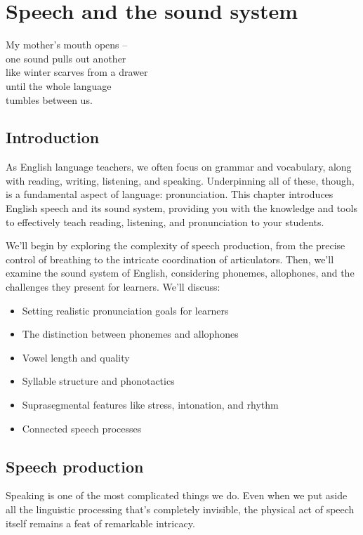 \chapter{Speech and the sound system}\label{ch:sound}

\epigraph{My mother's mouth opens --\\
one sound pulls out another\\
like winter scarves from a drawer\\
until the whole language\\
tumbles between us.}{}

\section{Introduction}

As English language teachers, we often focus on grammar and vocabulary, along with reading, writing, listening, and speaking. Underpinning all of these, though, is a fundamental aspect of language: pronunciation. This chapter introduces English speech and its sound system, providing you with the knowledge and tools to effectively teach reading, listening, and pronunciation to your students.

We'll begin by exploring the complexity of speech production, from the precise control of breathing to the intricate coordination of articulators. Then, we'll examine the sound system of English, considering phonemes, allophones, and the challenges they present for learners. We'll discuss:

\begin{itemize}[noitemsep]
    \item Setting realistic pronunciation goals for learners
    \item The distinction between phonemes and allophones
    \item Vowel length and quality
    \item {}Syllable structure and phonotactics
    \item {}Suprasegmental features like stress, intonation, and rhythm
    \item {}Connected speech processes
\end{itemize}

\section{Speech production}
Speaking is one of the most complicated things we do. Even when we put aside all the linguistic processing that's completely invisible, the physical act of speech itself remains a feat of remarkable intricacy.

